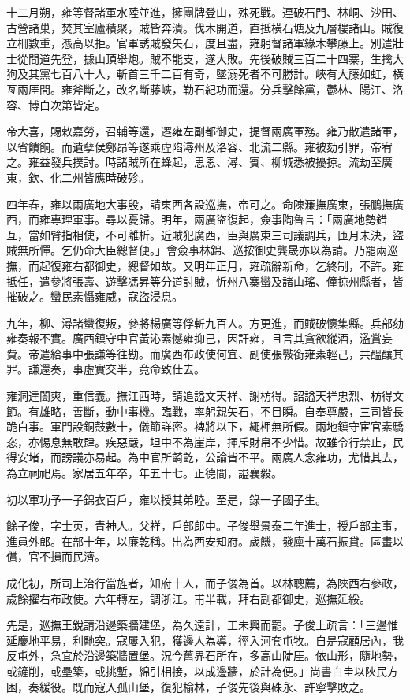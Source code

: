 \begin{pinyinscope}
十二月朔，雍等督諸軍水陸並進，擁團牌登山，殊死戰。連破石門、林峒、沙田、古營諸巢，焚其室廬積聚，賊皆奔潰。伐木開道，直抵橫石塘及九層樓諸山。賊復立柵數重，憑高以拒。官軍誘賊發矢石，度且盡，雍躬督諸軍緣木攀藤上。別遣壯士從間道先登，據山頂舉炮。賊不能支，遂大敗。先後破賊三百二十四寨，生擒大狗及其黨七百八十人，斬首三千二百有奇，墜溺死者不可勝計。峽有大藤如虹，橫亙兩厓間。雍斧斷之，改名斷藤峽，勒石紀功而還。分兵擊餘黨，鬱林、陽江、洛容、博白次第皆定。

帝大喜，賜敕嘉勞，召輔等還，遷雍左副都御史，提督兩廣軍務。雍乃散遣諸軍，以省饋餉。而遺孽侯鄭昂等遂乘虛陷潯州及洛容、北流二縣。雍被劾引罪，帝宥之。雍益發兵撲討。時諸賊所在蜂起，思恩、潯、賓、柳城悉被擾掠。流劫至廣東，欽、化二州皆應時破殄。

四年春，雍以兩廣地大事殷，請東西各設巡撫，帝可之。命陳濂撫廣東，張鵬撫廣西，而雍專理軍事。尋以憂歸。明年，兩廣盜復起，僉事陶魯言：「兩廣地勢錯互，當如臂指相使，不可離析。近賊犯廣西，臣與廣東三司議調兵，匝月未決，盜賊無所憚。乞仍命大臣總督便。」會僉事林錦、巡按御史龔晟亦以為請。乃罷兩巡撫，而起復雍右都御史，總督如故。又明年正月，雍疏辭新命，乞終制，不許。雍抵任，遣參將張壽、遊擊馮昇等分道討賊，忻州八寨蠻及諸山瑤、僮掠州縣者，皆摧破之。蠻民素懾雍威，寇盜浸息。

九年，柳、潯諸蠻復叛，參將楊廣等俘斬九百人。方更進，而賊破懷集縣。兵部劾雍奏報不實。廣西鎮守中官黃沁素憾雍抑己，因訐雍，且言其貪欲縱酒，濫賞妄費。帝遣給事中張謙等往勘。而廣西布政使何宜、副使張斅銜雍素輕己，共醞釀其罪。謙還奏，事虛實交半，竟命致仕去。

雍洞達闓爽，重信義。撫江西時，請追謚文天祥、謝枋得。詔謚天祥忠烈、枋得文節。有雄略，善斷，動中事機。臨戰，率躬親矢石，不目瞬。自奉尊嚴，三司皆長跪白事。軍門設銅鼓數十，儀節詳密。裨將以下，繩柙無所假。兩地鎮守宦官素驕恣，亦惕息無敢肆。疾惡嚴，坦中不為崖岸，揮斥財帛不少惜。故雖令行禁止，民得安堵，而謗議亦易起。為中官所齮齕，公論皆不平。兩廣人念雍功，尤惜其去，為立祠祀焉。家居五年卒，年五十七。正德間，謚襄毅。

初以軍功予一子錦衣百戶，雍以授其弟睦。至是，錄一子國子生。

餘子俊，字士英，青神人。父祥，戶部郎中。子俊舉景泰二年進士，授戶部主事，進員外郎。在部十年，以廉乾稱。出為西安知府。歲饑，發廩十萬石振貸。區畫以償，官不損而民濟。

成化初，所司上治行當旌者，知府十人，而子俊為首。以林聰薦，為陜西右參政，歲餘擢右布政使。六年轉左，調浙江。甫半載，拜右副都御史，巡撫延綏。

先是，巡撫王銳請沿邊築牆建堡，為久遠計，工未興而罷。子俊上疏言：「三邊惟延慶地平易，利馳突。寇屢入犯，獲邊人為導，徑入河套屯牧。自是寇顧居內，我反屯外，急宜於沿邊築牆置堡。況今舊界石所在，多高山陡厓。依山形，隨地勢，或鏟削，或壘築，或挑塹，綿引相接，以成邊牆，於計為便。」尚書白圭以陜民方困，奏緩役。既而寇入孤山堡，復犯榆林，子俊先後與硃永、許寧擊敗之。


\end{pinyinscope}
